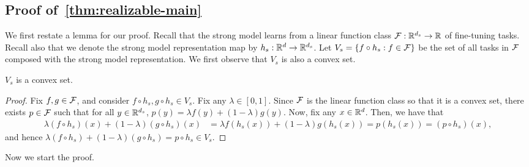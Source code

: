 \subsection{Proof of~\cref{thm:realizable-main}} \label{proof_theorem_1-main}



We first restate a lemma for our proof.
Recall that the strong model learns from a linear function class $\mathcal{F}:\mathbb{R}^{d_s} \to \mathbb{R}$ of fine-tuning tasks. Recall also that we denote the strong model representation map by $h_s:\mathbb{R}^d \to \mathbb{R}^{d_s}$. Let $V_s = \{f \circ h_s: f \in \mathcal{F}\}$ be the set of all tasks in $\mathcal{F}$ composed with the strong model representation. We first observe that $V_s$ is also a convex set.
\begin{lemma}
    \label{claim:Vs-convex}
    $V_s$ is a convex set.
\end{lemma}
\begin{proof}
    Fix $f, g \in \mathcal{F}$, and consider $f \circ h_s, g \circ h_s \in V_s$. Fix any $\lambda \in [0,1]$. Since $\mathcal{F}$ is the linear function class so that it is a convex set, there exists $p \in \mathcal{F}$ such that for all $y \in \mathbb{R}^{d_s}$, $p(y) = \lambda f(y) + (1-\lambda)g(y)$. Now, fix any $x \in \mathbb{R}^d$. Then, we have that
    \begin{align*}
        \lambda (f \circ h_s)(x) + (1-\lambda)(g \circ h_s)(x) &= \lambda f(h_s(x)) + (1-\lambda)g(h_s(x))
        = p(h_s(x)) = (p \circ h_s)(x),
    \end{align*}
    and hence $\lambda (f \circ h_s) + (1-\lambda)(g \circ h_s) = p \circ h_s \in V_s$.
\end{proof}


Now we start the proof.

